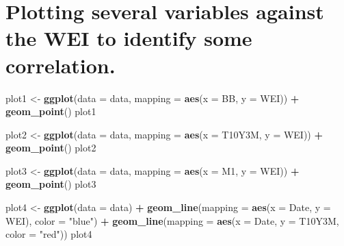 \documentclass[]{article}
\newenvironment{Shaded}{\begin{snugshade}}{\end{snugshade}}
\newcommand{\KeywordTok}[1]{\textcolor[rgb]{0.13,0.29,0.53}{\textbf{#1}}}
\newcommand{\DataTypeTok}[1]{\textcolor[rgb]{0.13,0.29,0.53}{#1}}
\newcommand{\StringTok}[1]{\textcolor[rgb]{0.31,0.60,0.02}{#1}}
\newcommand{\OperatorTok}[1]{\textcolor[rgb]{0.81,0.36,0.00}{\textbf{#1}}}
\newcommand{\NormalTok}[1]{#1}
\begin{document}
\section{Plotting several variables against the WEI to identify some
correlation.}\label{plotting-several-variables-against-the-wei-to-identify-some-correlation.}

\begin{Shaded}
\begin{Highlighting}[]
\NormalTok{plot1 <-}\StringTok{ }\KeywordTok{ggplot}\NormalTok{(}\DataTypeTok{data =}\NormalTok{ data, }\DataTypeTok{mapping =} \KeywordTok{aes}\NormalTok{(}\DataTypeTok{x =}\NormalTok{ BB, }\DataTypeTok{y =}\NormalTok{ WEI)) }\OperatorTok{+}
\StringTok{  }\KeywordTok{geom_point}\NormalTok{()}
\NormalTok{plot1}

\NormalTok{plot2 <-}\StringTok{ }\KeywordTok{ggplot}\NormalTok{(}\DataTypeTok{data =}\NormalTok{ data, }\DataTypeTok{mapping =} \KeywordTok{aes}\NormalTok{(}\DataTypeTok{x =}\NormalTok{ T10Y3M, }\DataTypeTok{y =}\NormalTok{ WEI)) }\OperatorTok{+}
\StringTok{  }\KeywordTok{geom_point}\NormalTok{() }
\NormalTok{plot2}

\NormalTok{plot3 <-}\StringTok{ }\KeywordTok{ggplot}\NormalTok{(}\DataTypeTok{data =}\NormalTok{ data, }\DataTypeTok{mapping =} \KeywordTok{aes}\NormalTok{(}\DataTypeTok{x =}\NormalTok{ M1, }\DataTypeTok{y =}\NormalTok{ WEI)) }\OperatorTok{+}
\StringTok{  }\KeywordTok{geom_point}\NormalTok{()}
\NormalTok{plot3}

\NormalTok{plot4 <-}\StringTok{ }\KeywordTok{ggplot}\NormalTok{(}\DataTypeTok{data =}\NormalTok{ data) }\OperatorTok{+}
\StringTok{  }\KeywordTok{geom_line}\NormalTok{(}\DataTypeTok{mapping =} \KeywordTok{aes}\NormalTok{(}\DataTypeTok{x =}\NormalTok{ Date, }\DataTypeTok{y =}\NormalTok{ WEI), }\DataTypeTok{color =} \StringTok{"blue"}\NormalTok{) }\OperatorTok{+}
\StringTok{  }\KeywordTok{geom_line}\NormalTok{(}\DataTypeTok{mapping =} \KeywordTok{aes}\NormalTok{(}\DataTypeTok{x =}\NormalTok{ Date, }\DataTypeTok{y =}\NormalTok{ T10Y3M, }\DataTypeTok{color =} \StringTok{"red"}\NormalTok{))}
\NormalTok{plot4}


\end{Highlighting}
\end{Shaded}
\end{document}
